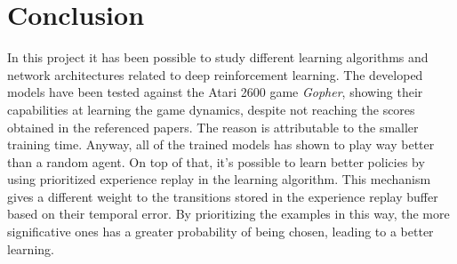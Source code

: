 \documentclass[article,11pt]{article}
\begin{document}
	\section{Conclusion}
	In this project it has been possible to study different learning algorithms and network architectures related to deep reinforcement learning. The developed models have been tested against the Atari 2600 game \textit{Gopher}, showing their capabilities at learning the game dynamics, despite not reaching the scores obtained in the referenced papers. The reason is attributable to the smaller training time. Anyway, all of the trained models has shown to play way better than a random agent.
	On top of that, it's possible to learn better policies by using prioritized experience replay \cite{prioritized} in the learning algorithm. This mechanism gives a different weight to the transitions stored in the experience replay buffer based on their temporal error. By prioritizing the examples in this way, the more significative ones has a greater probability of being chosen, leading to a better learning.
	
	
	
\end{document}
